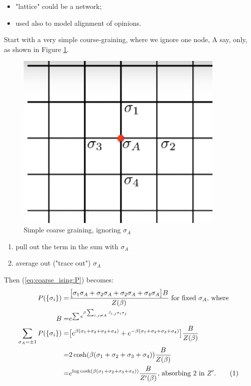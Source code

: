 \documentclass[]{article}
\newcommand\numberthis{\addtocounter{equation}{1}\tag{\theequation}}
\begin{document}
\begin{itemize}
	\item "lattice" could be a network;
	\item used also to model alignment of opinions.
\end{itemize}

Start with a very simple course-graining, where we ignore one node, A say, only, as shown in Figure \ref{fig:ising-coarse1}.

\begin{figure}[H]
	\caption{Simple coarse graining, ignoring $\sigma_A$}\label{fig:ising-coarse1}
	\includegraphics[width=0.9\textwidth]{ising-coarse1}
\end{figure}

\begin{enumerate}
	\item pull out the term in the sum with $\sigma_A$
	\item average out ("trace out") $\sigma_A$
\end{enumerate}
Then (\ref{eq:coarse_ising:P}) becomes:
\begin{align*}
P(\{\sigma_i\}) =& \frac{\big[\sigma_1\sigma_A + \sigma_2\sigma_A + \sigma_2\sigma_A + \sigma_4\sigma_A\big]B}{Z(\beta)} \text{ for fixed $\sigma_A$, where}\\
B =& e^{\sum e^{\beta \sum_{i,j \ne A} J_{i,j} \sigma_i \sigma_j}}\\
\sum_{\sigma_A=\pm 1} P(\{\sigma_i\}) =& \big[e^{\beta(\sigma_1+\sigma_2+\sigma_3+\sigma_4)} + e^{-\beta(\sigma_1+\sigma_2+\sigma_3+\sigma_4)}\big]  \frac{B}{Z(\beta)}\\
=& 2 \cosh({\beta(\sigma_1+\sigma_2+\sigma_3+\sigma_4)})   \frac{B}{Z(\beta)}\\
=& e^{\log{\cosh({\beta(\sigma_1+\sigma_2+\sigma_3+\sigma_4)})}} \frac{B}{Z^\prime(\beta)} \text{, absorbing $2$ in $Z^{\prime}$.} \numberthis \label{eq:coarse_ising:P2}
\end{align*}
\end{document}
